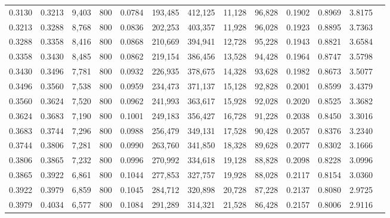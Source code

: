 \begin{tabular}{rrrrrrrrrrrrr}
0.3130 & 0.3213 &  9,403 &   800 &                                     0.0784 & 193,485 & 412,125 &  11,128 &  96,828 & 0.1902 & 0.8969 & 3.8175 \\
0.3213 & 0.3288 &  8,768 &   800 &                                     0.0836 & 202,253 & 403,357 &  11,928 &  96,028 & 0.1923 & 0.8895 & 3.7363 \\
0.3288 & 0.3358 &  8,416 &   800 &                                     0.0868 & 210,669 & 394,941 &  12,728 &  95,228 & 0.1943 & 0.8821 & 3.6584 \\
0.3358 & 0.3430 &  8,485 &   800 &                                     0.0862 & 219,154 & 386,456 &  13,528 &  94,428 & 0.1964 & 0.8747 & 3.5798 \\
0.3430 & 0.3496 &  7,781 &   800 &                                     0.0932 & 226,935 & 378,675 &  14,328 &  93,628 & 0.1982 & 0.8673 & 3.5077 \\
0.3496 & 0.3560 &  7,538 &   800 &                                     0.0959 & 234,473 & 371,137 &  15,128 &  92,828 & 0.2001 & 0.8599 & 3.4379 \\
0.3560 & 0.3624 &  7,520 &   800 &                                     0.0962 & 241,993 & 363,617 &  15,928 &  92,028 & 0.2020 & 0.8525 & 3.3682 \\
0.3624 & 0.3683 &  7,190 &   800 &                                     0.1001 & 249,183 & 356,427 &  16,728 &  91,228 & 0.2038 & 0.8450 & 3.3016 \\
0.3683 & 0.3744 &  7,296 &   800 &                                     0.0988 & 256,479 & 349,131 &  17,528 &  90,428 & 0.2057 & 0.8376 & 3.2340 \\
0.3744 & 0.3806 &  7,281 &   800 &                                     0.0990 & 263,760 & 341,850 &  18,328 &  89,628 & 0.2077 & 0.8302 & 3.1666 \\
0.3806 & 0.3865 &  7,232 &   800 &                                     0.0996 & 270,992 & 334,618 &  19,128 &  88,828 & 0.2098 & 0.8228 & 3.0996 \\
0.3865 & 0.3922 &  6,861 &   800 &                                     0.1044 & 277,853 & 327,757 &  19,928 &  88,028 & 0.2117 & 0.8154 & 3.0360 \\
0.3922 & 0.3979 &  6,859 &   800 &                                     0.1045 & 284,712 & 320,898 &  20,728 &  87,228 & 0.2137 & 0.8080 & 2.9725 \\
0.3979 & 0.4034 &  6,577 &   800 &                                     0.1084 & 291,289 & 314,321 &  21,528 &  86,428 & 0.2157 & 0.8006 & 2.9116 \\

\end{tabular}
